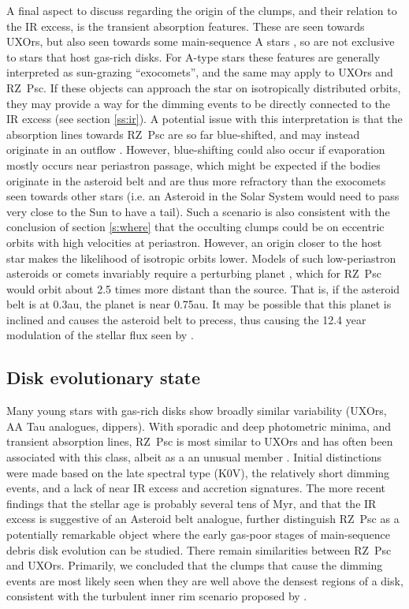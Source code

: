 \documentclass[useAMS,usenatbib,usegraphicx]{mn2e}
\begin{document}
A final aspect to discuss regarding the origin of the clumps, and their relation to the
IR excess, is the transient absorption features. These are seen towards UXOrs, but also
seen towards some main-sequence A stars
\citep[e.g.][]{1987A&A...185..267F,2013PASP..125..759W,2014A&A...561L..10K}, so are not
exclusive to stars that host gas-rich disks. For A-type stars these features are
generally interpreted as sun-grazing ``exocomets'', and the same may apply to UXOrs and
RZ~Psc. If these objects can approach the star on isotropically distributed orbits, they
may provide a way for the dimming events to be directly connected to the IR excess (see
section \ref{ss:ir}). A potential issue with this interpretation is that the absorption
lines towards RZ~Psc are so far blue-shifted, and may instead originate in an outflow
\citep{2013Ap.....56..453P}. However, blue-shifting could also occur if evaporation
mostly occurs near periastron passage, which might be expected if the bodies originate in
the asteroid belt and are thus more refractory than the exocomets seen towards other
stars (i.e. an Asteroid in the Solar System would need to pass very close to the Sun to
have a tail). Such a scenario is also consistent with the conclusion of section
\ref{s:where} that the occulting clumps could be on eccentric orbits with high velocities
at periastron. However, an origin closer to the host star makes the likelihood of
isotropic orbits lower. Models of such low-periastron asteroids or comets invariably
require a perturbing planet \citep[e.g.][]{1990A&A...236..202B,1996Icar..120..358B},
which for RZ~Psc would orbit about 2.5 times more distant than the source. That is, if
the asteroid belt is at 0.3au, the planet is near 0.75au. It may be possible that this
planet is inclined and causes the asteroid belt to precess, thus causing the 12.4 year
modulation of the stellar flux seen by \citet{2013A&A...553L...1D}.

\subsection{Disk evolutionary state}\label{ss:evol}

Many young stars with gas-rich disks show broadly similar variability (UXOrs, AA Tau
analogues, dippers). With sporadic and deep photometric minima, and transient absorption
lines, RZ~Psc is most similar to UXOrs and has often been associated with this class,
albeit as a an unusual member \citep[e.g.][]{2010A&A...524A...8G}. Initial distinctions
were made based on the late spectral type (K0V), the relatively short dimming events, and
a lack of near IR excess and accretion signatures. The more recent findings that the
stellar age is probably several tens of Myr, and that the IR excess is suggestive of an
Asteroid belt analogue, further distinguish RZ~Psc as a potentially remarkable object
where the early gas-poor stages of main-sequence debris disk evolution can be
studied. There remain similarities between RZ~Psc and UXOrs. Primarily, we concluded that
the clumps that cause the dimming events are most likely seen when they are well above
the densest regions of a disk, consistent with the turbulent inner rim scenario proposed
by \citet{2003ApJ...594L..47D}.
\end{document}
